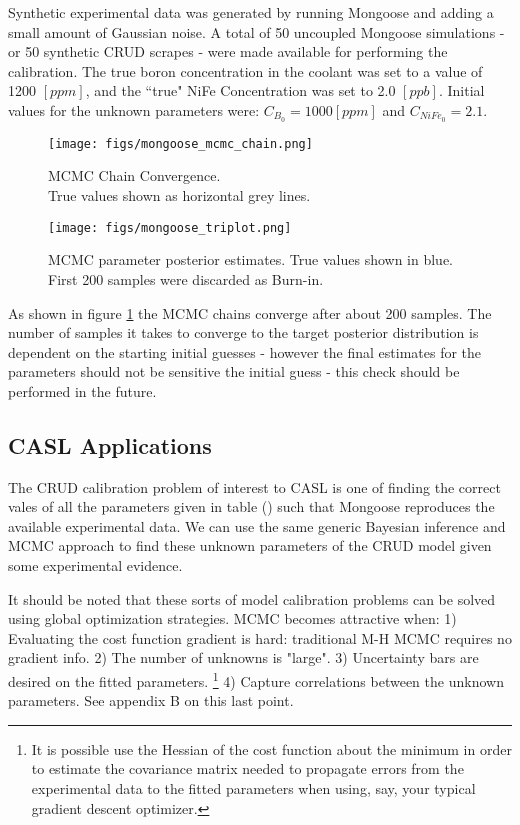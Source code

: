 \documentclass[10pt,a4paper]{report}
\begin{document}
Synthetic experimental data was generated by running Mongoose and adding a small amount of Gaussian noise.  A total of 50 uncoupled Mongoose simulations - or 50 synthetic CRUD scrapes - were made available for performing the calibration.  The true boron concentration in the coolant was set to a value of 1200 $[ppm]$, and the ``true" NiFe Concentration was set to 2.0 $[ppb]$. Initial values for the unknown parameters were: $C_{B_0} = 1000 [ppm]$ and $C_{NiFe_0} = 2.1$.

\begin{figure}
    \centering
    \begin{minipage}{.5\textwidth}
        \centering
        \texttt{[image: figs/mongoose\_mcmc\_chain.png]}
        \caption{MCMC Chain Convergence.  \\
            True values
        shown as horizontal grey lines. \label{fig:mg_chain}}
    \end{minipage}%
    \begin{minipage}{.5\textwidth}
        \centering
        \texttt{[image: figs/mongoose\_triplot.png]}
        \caption{MCMC parameter posterior estimates. True values shown in blue. First 200 samples were discarded as Burn-in.}
    \end{minipage}
\end{figure}

As shown in figure \ref{fig:mg_chain} the MCMC chains converge after about 200 samples.  The number of samples it takes to converge to the target posterior distribution is dependent on the starting initial guesses - however the final estimates for the parameters should not be sensitive the initial guess - this check should be performed in the future.

\subsection{CASL Applications}

The CRUD calibration problem of interest to CASL is one of finding the correct vales of all the parameters given in table () such that Mongoose reproduces the available experimental data.
We can use the same generic Bayesian inference and MCMC approach to find these unknown parameters of the CRUD model given some experimental evidence.

It should be noted that these sorts of model calibration problems can be solved using global optimization strategies.  MCMC becomes attractive when: 1) Evaluating the cost function gradient is hard: traditional M-H MCMC requires no gradient info. 2) The number of unknowns is "large". 3) Uncertainty bars are desired on the fitted parameters. \footnote{It is possible use the Hessian of the cost function about the minimum in order to estimate the covariance matrix needed to propagate errors from the experimental data to the fitted parameters when using, say, your typical gradient descent optimizer.}
 4) Capture correlations between the unknown parameters.  See appendix B on this last point.
\end{document}
